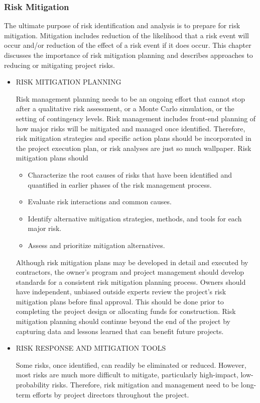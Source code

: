 \documentclass[oneside,a4paper,12pt]{book}
\begin{document}
\subsubsection{Risk Mitigation}
The ultimate purpose of risk identification and analysis is to prepare for risk mitigation. Mitigation includes reduction of the likelihood that a risk event will occur and/or reduction of the effect of a risk event if it does occur. This chapter discusses the importance of risk mitigation planning and describes approaches to reducing or mitigating project risks.
\begin{itemize}
    \item RISK MITIGATION PLANNING
    \par
Risk management planning needs to be an ongoing effort that cannot stop after a qualitative risk assessment, or a Monte Carlo simulation, or the setting of contingency levels. Risk management includes front-end planning of how major risks will be mitigated and managed once identified. Therefore, risk mitigation strategies and specific action plans should be incorporated in the project execution plan, or risk analyses are just so much wallpaper. Risk mitigation plans should
\begin{itemize}
    \item Characterize the root causes of risks that have been identified and quantified in earlier phases of the risk management process.
    \item Evaluate risk interactions and common causes.
    \item Identify alternative mitigation strategies, methods, and tools for each major risk.
    \item Assess and prioritize mitigation alternatives.
\end{itemize}
Although risk mitigation plans may be developed in detail and executed by contractors, the owner’s program and project management should develop standards for a consistent risk mitigation planning process. Owners should have independent, unbiased outside experts review the project’s risk mitigation plans before final approval. This should be done prior to completing the project design or allocating funds for construction. Risk mitigation planning should continue beyond the end of the project by capturing data and lessons learned that can benefit future projects.
\item RISK RESPONSE AND MITIGATION TOOLS
\par 
Some risks, once identified, can readily be eliminated or reduced. However, most risks are much more difficult to mitigate, particularly high-impact, low-probability risks. Therefore, risk mitigation and management need to be long-term efforts by project directors throughout the project.

\end{itemize}
\end{document}
